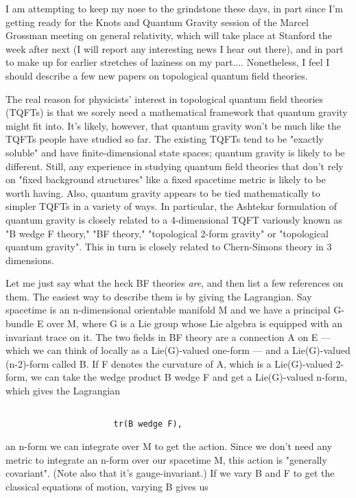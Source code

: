 

I am attempting to keep my nose to the grindstone these days, in part
since I'm getting ready for the Knots and Quantum Gravity session of
the Marcel Grossman meeting on general relativity, which will take place at
Stanford the week after next (I will report any interesting news I hear
out there), and in part to make up for earlier stretches of laziness on
my part....  Nonetheless, I feel I should describe a few new papers on
topological quantum field theories.

The real reason for physicists' interest in topological quantum field
theories (TQFTs) is that we sorely need a mathematical framework that
quantum gravity might fit into.  It's likely, however, that quantum
gravity won't be much like the TQFTs people have studied so far.  The
existing TQFTs tend to be "exactly soluble" and have finite-dimensional
state spaces; quantum gravity is likely to be different.  Still, any
experience in studying quantum field theories that don't rely on "fixed
background structures" like a fixed spacetime metric is likely to be
worth having.  Also, quantum gravity appears to be tied mathematically
to simpler TQFTs in a variety of ways.  In particular, the Ashtekar
formulation of quantum gravity is closely related to a 4-dimensional
TQFT variously known as "B wedge F theory," "BF theory," "topological
2-form gravity" or "topological quantum gravity".  This in turn is
closely related to Chern-Simons theory in 3 dimensions.

Let me just say what the heck BF theories \emph{are}, and then list a few
references on them.  The easiest way to describe them is by giving the
Lagrangian.  Say spacetime is an n-dimensional orientable manifold M and
we have a principal G-bundle E over M, where G is a Lie group whose Lie
algebra is equipped with an invariant trace on it.  The two fields in BF
theory are a connection A on E --- which we can think of locally as a
Lie(G)-valued one-form --- and a Lie(G)-valued (n-2)-form called B.  If
F denotes the curvature of A, which is a Lie(G)-valued 2-form, we can
take the wedge product B wedge F and get a Lie(G)-valued n-form, which
gives the Lagrangian


\begin{verbatim}

                      tr(B wedge F),
\end{verbatim}
    

an n-form we can integrate over M to get the action.  Since we don't
need any metric to integrate an n-form over our spacetime M, this action
is "generally covariant".  (Note also that it's gauge-invariant.)  If we
vary B and F to get the classical equations of motion, varying B gives us


